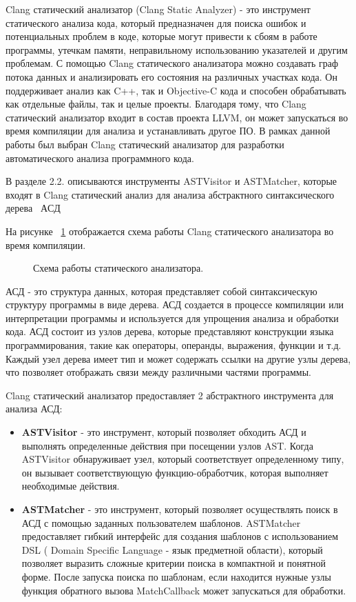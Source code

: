 Clang статический анализатор (Clang Static Analyzer) - это инструмент статического анализа кода, который предназначен для поиска ошибок и потенциальных проблем в коде, которые могут привести к сбоям в работе программы, утечкам памяти, неправильному использованию указателей и другим проблемам. С помощью Clang статического анализатора можно  создавать граф потока данных и анализировать его состояния на различных участках кода. Он поддерживает анализ как C++, так и Objective-C кода и способен обрабатывать как отдельные файлы, так и целые проекты. Благодаря тому, что Clang статический анализатор входит в состав проекта LLVM, он может запускаться во время компиляции для анализа и устанавливать другое ПО.
В рамках данной работы был выбран Clang статический анализатор для разработки автоматического анализа программного кода. 

В разделе 2.2. описываются инструменты ASTVisitor и ASTMatcher, которые входят в Clang статический анализ для анализа абстрактного синтаксического дерева~\autocite{aho2007compilers} \(АСД\) 

На рисунке ~\cref{fig:ClangSA} отображается схема работы Clang статического анализатора во время компиляции.
\begin{figure}[ht]
    \caption{Схема работы статического анализатора.}\label{fig:ClangSA}
\end{figure}

АСД - это структура данных, которая представляет собой синтаксическую структуру программы в виде дерева. АСД создается в процессе компиляции или интерпретации программы и используется для упрощения анализа и обработки кода. АСД состоит из узлов дерева, которые представляют конструкции языка программирования, такие как операторы, операнды, выражения, функции и т.д. Каждый узел дерева имеет тип и может содержать ссылки на другие узлы дерева, что позволяет отображать связи между различными частями программы.

Clang статический анализатор предоставляет 2 абстрактного инструмента для анализа АСД:
\begin{itemize}
    \item {\textbf{ASTVisitor}} - это инструмент, который позволяет обходить АСД и выполнять определенные действия при посещении узлов AST. Когда ASTVisitor обнаруживает узел, который соответствует определенному типу, он вызывает соответствующую функцию-обработчик, которая выполняет необходимые действия.
    \item {\textbf{ASTMatcher}} - это инструмент, который позволяет осуществлять поиск в АСД с помощью заданных пользователем шаблонов. ASTMatcher предоставляет гибкий интерфейс для создания шаблонов с использованием DSL ( Domain Specific Language - язык предметной области), который позволяет выразить сложные критерии поиска в компактной и понятной форме. После запуска поиска по шаблонам, если находится нужные узлы функция обратного вызова MatchCallback может запускаться для обработки.
\end{itemize}

